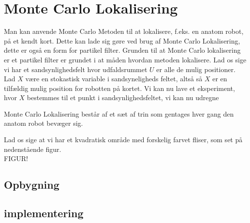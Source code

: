 \documentclass[../../SRP.tex]{subfiles}
\begin{document}
\chapter{Monte Carlo Lokalisering}

Man kan anvende Monte Carlo Metoden til at lokalisere, f.eks. en anatom robot, på et kendt kort. Dette kan lade sig gøre ved brug af Monte Carlo Lokalisering, dette er også en form for partikel filter. Grunden til at Monte Carlo lokalisering er et partikel filter er grundet i at måden hvordan metoden lokalisere. Lad os sige vi har et sandsynlighedsfelt hvor udfaldsrummet $U$ er alle de mulig positioner. Lad $X$ være en stokastisk variable i sandsyneligheds feltet, altså så $X$ er en tilfældig mulig position for robotten på kortet. Vi kan nu lave et eksperiment, hvor $X$ bestemmes til et punkt i sandsynlighedsfeltet, vi kan nu udregne 

Monte Carlo Lokalisering består af et sæt af trin som gentages hver gang den anatom robot bevæger sig. 

Lad os sige at vi har et kvadratisk område med forskelig farvet fliser, som set på nedenstående figur. \\

\Huge{FIGUR!} \\

\section{Opbygning}

\section{implementering}
\end{document}
